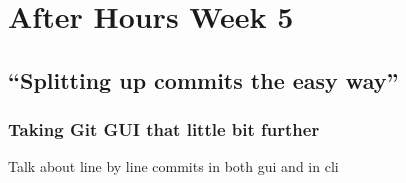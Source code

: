 \chapter{After Hours Week 5}
\section{``Splitting up commits the easy way''}
\subsection{Taking Git GUI that little bit further}

Talk about line by line commits in both gui and in cli
